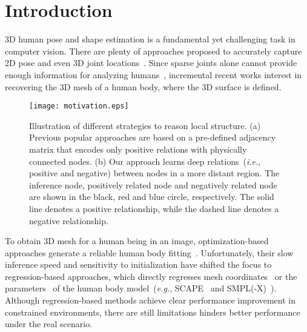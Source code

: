 \documentclass[sigplan]{acmart}
\def\eg{\emph{e.g.}}
\def\ie{\emph{i.e.}}
\begin{document}
\section{Introduction}
\label{intro}
3D human pose and shape estimation is a fundamental yet challenging task in computer vision. There are plenty of approaches proposed to accurately capture 2D pose and even 3D joint locations~\cite{SunXLW19,zhaoCVPR19semantic,Sharma_2019_ICCV,fabbri2020compressed,Zhou_2019_ICCV,Li_2019_CVPR}. Since sparse joints alone cannot provide enough information for analyzing humans~\cite{kolotouros2019convolutional}, incremental recent works interest in recovering the 3D mesh of a human body, where the 3D surface is defined. 

\begin{figure}[]
\centering
\texttt{[image: motivation.eps]}
\caption{Illustration of different strategies to reason local structure. (a) Previous popular approaches are based on a pre-defined adjacency matrix that encodes only positive relations with physically connected nodes. (b) Our approach learns deep relations~(\ie, positive and negative) between nodes in a more distant region. The inference node, positively related node and negatively related node are shown in the black, red and blue circle, respectively. The solid line denotes a positive relationship, while the dashed line denotes a negative relationship.}
\label{pic:mot}
\end{figure}

To obtain 3D mesh for a human being in an image, optimization-based approaches generate a reliable human body fitting~\cite{bogo2016keep,lassner2017unite}. Unfortunately, their slow inference speed and sensitivity to initialization have shifted the focus to regression-based approaches, which directly regresses mesh coordinates~\cite{kolotouros2019convolutional,Choi_2020_ECCV_Pose2Mesh,pointMesh} or the parameters~\cite{kanazawa2018end-to-end,omran2018neural,pavlakos2018learning} of the human body model~(\eg, SCAPE~\cite{SCAPE2005} and SMPL(-X)~\cite{smpl2015,smplxCvpr2019,MANO2017}). Although regression-based methods achieve clear performance improvement in constrained environments, there are still limitations hinders better performance under the real scenario.
\end{document}
